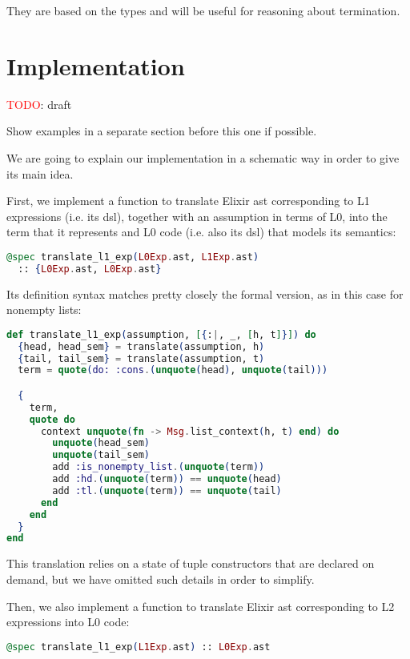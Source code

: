 They are based on the types and will be useful for reasoning about termination.

\section{Implementation}

\textcolor{red}{TODO}: draft

Show examples in a separate section before this one if possible.

We are going to explain our implementation in a schematic way in order to give its 
main idea. 

First, we implement a function to translate Elixir \gls{ast} corresponding
to L1 expressions (i.e. its \gls{dsl}), together with an assumption in terms of L0, 
into the term that it represents and L0 code (i.e. also its \gls{dsl}) that models 
its semantics:

\begin{lstlisting}[language=elixir,numbers=none,frame=none]
@spec translate_l1_exp(L0Exp.ast, L1Exp.ast) 
  :: {L0Exp.ast, L0Exp.ast}
\end{lstlisting}

Its definition syntax matches pretty closely the formal version, as in this 
case for nonempty lists:

\begin{lstlisting}[language=elixir,numbers=none,frame=none]
def translate_l1_exp(assumption, [{:|, _, [h, t]}]) do
  {head, head_sem} = translate(assumption, h)
  {tail, tail_sem} = translate(assumption, t)
  term = quote(do: :cons.(unquote(head), unquote(tail)))

  {
    term,
    quote do
      context unquote(fn -> Msg.list_context(h, t) end) do
        unquote(head_sem)
        unquote(tail_sem)
        add :is_nonempty_list.(unquote(term))
        add :hd.(unquote(term)) == unquote(head)
        add :tl.(unquote(term)) == unquote(tail)
      end
    end
  }
end
\end{lstlisting}

This translation relies on a state of tuple constructors that are declared on 
demand, but we have omitted such details in order to simplify.

Then, we also implement a function to translate Elixir \gls{ast} corresponding
to L2 expressions into L0 code:

\begin{lstlisting}[language=elixir,numbers=none,frame=none]
@spec translate_l1_exp(L1Exp.ast) :: L0Exp.ast
\end{lstlisting}

